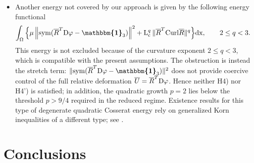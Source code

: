 \documentclass[11pt]{article}
\newcommand{\id}{{\boldsymbol{\mathbbm{1}}}}
\newcommand{\sym}{{\rm sym}}
\newcommand{\Curl}{{\rm Curl}}
\def\dd{\displaystyle}
\def\dd{\displaystyle}
\def\dd{\displaystyle}
\def\dd{\displaystyle}
\renewcommand{\dd}{\displaystyle}
\begin{document}
\begin{itemize}
 {
These results concern rank-one convexity or polyconvexity with respect
to the deformation gradient $F$ and should be distinguished from the
hypothesis used in the present paper, which requires convexity with
respect to the independent lifted variables. In particular, the
logarithmic representations above do not provide the global convexity
in $\overline U$ required by H2) or H2'). Consequently, the
three-dimensional exponentiated logarithmic and exponentiated Hencky
models are not directly covered by the present existence framework.}

\item Another energy not covered by our approach is given by the following energy functional \cite{Neff_Habil04}	\begin{align}\label{minprob}
		\dd\int_{\Omega }\Big\{&
       \mu 
        \left\|\sym(
       \overline{R}^T{\rm D}\varphi
        -
        \id_3)
        \right\|^2
        +{\rm L}_{\rm c}^q \,\|\overline R^T\Curl \overline R\|^q        \Big\}{\rm d}{\rm x}, \qquad 2\leq q<3.	\end{align} This energy is not excluded because of the curvature exponent
$2\leq q<3$, which is compatible with the present assumptions.
The obstruction is instead the stretch term:
$\|\sym(\overline R^T{\rm D}\varphi-\id_3)\|^2$ does not provide
coercive control of the full relative deformation
$\overline U=\overline R^T{\rm D}\varphi$. Hence neither H4) nor H4')
is satisfied; in addition, the quadratic growth $p=2$ lies below the
threshold $p>9/4$ required in the reduced regime.  {Existence results for this type of degenerate quadratic Cosserat energy
rely on generalized Korn inequalities of a different type; see
\cite{neff2002korn}}.
\end{itemize}



\section{Conclusions}
\end{document}
